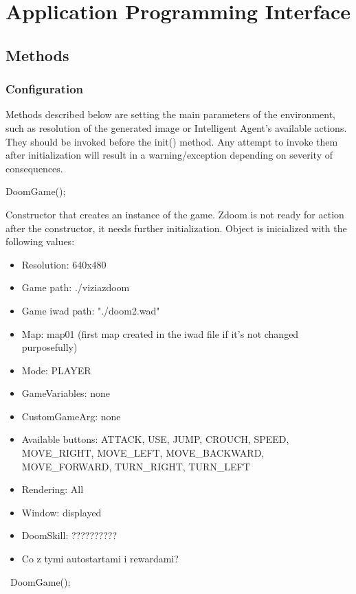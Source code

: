 
\chapter{Application Programming Interface}
\section{Methods}
	\subsection{Configuration}
	Methods described below are setting the main parameters of the environment, such as resolution of the generated image or Intelligent Agent's available actions. They should be invoked before the init() method. Any attempt to invoke them after initialization will result in a warning/exception depending on severity of consequences. 
	\vspace{20pt}

		\begin{clinee}
		DoomGame();
		\end{clinee}

Constructor that creates an instance of the game. Zdoom is not ready for action after the constructor, it needs further initialization. Object is inicialized with the following values:
	\begin{itemize}
\item Resolution: 640x480
\item Game path: ./viziazdoom
\item Game iwad path: "./doom2.wad"
\item Map: map01 (first map created in the iwad file if it's not changed purposefully)
\item Mode: PLAYER
\item GameVariables: none
\item CustomGameArg: none
\item Available buttons: ATTACK, USE, JUMP, CROUCH, SPEED, MOVE\_RIGHT, MOVE\_LEFT, MOVE\_BACKWARD, MOVE\_FORWARD, TURN\_RIGHT, TURN\_LEFT
\item Rendering: All
\item Window: displayed 
\item DoomSkill: ??????????
\item Co z tymi autostartami i rewardami?
	\end{itemize}


\vspace{20pt}
\begin{clinee}
~DoomGame();
\end{clinee}

